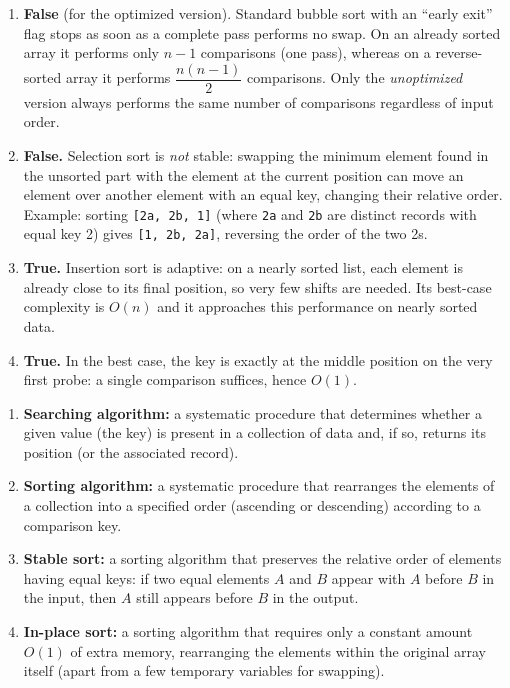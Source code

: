\documentclass[11pt]{article}
\newcommand{\cle}[1]{{\popxbold\color{popdark}#1}}
\begin{document}
\begin{corrige}
\begin{enumerate}
\item \textbf{False} (for the optimized version). Standard bubble sort with an ``early exit'' flag stops as soon as a complete pass performs no swap. On an already sorted array it performs only $n-1$ comparisons (one pass), whereas on a reverse-sorted array it performs $\dfrac{n(n-1)}{2}$ comparisons. Only the \emph{unoptimized} version always performs the same number of comparisons regardless of input order.
\item \textbf{False.} Selection sort is \emph{not} stable: swapping the minimum element found in the unsorted part with the element at the current position can move an element over another element with an equal key, changing their relative order. Example: sorting \texttt{[2a, 2b, 1]} (where \texttt{2a} and \texttt{2b} are distinct records with equal key 2) gives \texttt{[1, 2b, 2a]}, reversing the order of the two 2s.
\item \textbf{True.} Insertion sort is \cle{adaptive}: on a nearly sorted list, each element is already close to its final position, so very few shifts are needed. Its best-case complexity is $O(n)$ and it approaches this performance on nearly sorted data.
\item \textbf{True.} In the best case, the key is exactly at the middle position on the very first probe: a single comparison suffices, hence $O(1)$.
\end{enumerate}
\end{corrige}

\begin{corrige}
\begin{enumerate}
\item \textbf{Searching algorithm:} a systematic procedure that determines whether a given value (the \cle{key}) is present in a collection of data and, if so, returns its position (or the associated record).
\item \textbf{Sorting algorithm:} a systematic procedure that rearranges the elements of a collection into a specified order (ascending or descending) according to a comparison key.
\item \textbf{Stable sort:} a sorting algorithm that preserves the relative order of elements having equal keys: if two equal elements $A$ and $B$ appear with $A$ before $B$ in the input, then $A$ still appears before $B$ in the output.
\item \textbf{In-place sort:} a sorting algorithm that requires only a constant amount $O(1)$ of extra memory, rearranging the elements within the original array itself (apart from a few temporary variables for swapping).
\end{enumerate}
\end{corrige}
\end{document}
